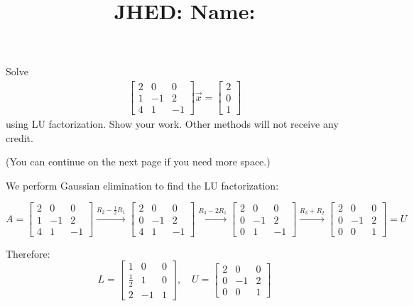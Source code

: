 \documentclass[reqno]{exam}
\title{\normalsize{
  JHED: \underline{\hspace{4cm}} \hspace{1em} Name: \underline{\hspace{9cm}}}
   }
\author{}
\date{}
\begin{document}
\maketitle
\vspace{-2cm} %

\begin{questions}

\question Solve 
  \begin{align*}
    \begin{bmatrix} 2 & 0 & 0 \\ 1 & -1 & 2 \\ 4 & 1 & -1 \end{bmatrix} \vec{x} = \begin{bmatrix} 2 \\ 0 \\ 1 \end{bmatrix}
  \end{align*}
  using LU factorization. Show your work. Other methods will not receive any credit.

  (You can continue on the next page if you need more space.)
  \begin{solution}
    We perform Gaussian elimination to find the LU factorization:
    
    $$A = \begin{bmatrix} 2 & 0 & 0 \\ 1 & -1 & 2 \\ 4 & 1 & -1 \end{bmatrix} \xrightarrow{R_2 - \frac{1}{2}R_1} \begin{bmatrix} 2 & 0 & 0 \\ 0 & -1 & 2 \\ 4 & 1 & -1 \end{bmatrix} \xrightarrow{R_3 - 2R_1} \begin{bmatrix} 2 & 0 & 0 \\ 0 & -1 & 2 \\ 0 & 1 & -1 \end{bmatrix} \xrightarrow{R_3 + R_2} \begin{bmatrix} 2 & 0 & 0 \\ 0 & -1 & 2 \\ 0 & 0 & 1 \end{bmatrix} = U$$

    Therefore:
    $$L = \begin{bmatrix} 1 & 0 & 0 \\ \frac{1}{2} & 1 & 0 \\ 2 & -1 & 1 \end{bmatrix}, \quad U = \begin{bmatrix} 2 & 0 & 0 \\ 0 & -1 & 2 \\ 0 & 0 & 1 \end{bmatrix}$$


\end{solution}
\end{questions}
\end{document}

